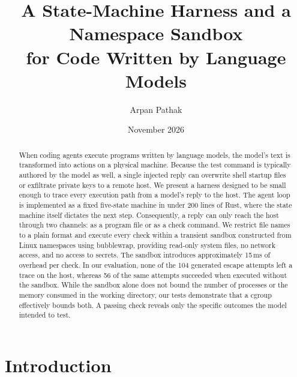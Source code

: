 \documentclass[10pt,twocolumn,a4paper]{article}
\title{\textbf{A State-Machine Harness and a Namespace Sandbox\\for Code Written by Language Models}}
\author{Arpan Pathak}
\date{November 2026}
\begin{document}
\maketitle

\begin{abstract}
When coding agents execute programs written by language models, the model's text is transformed into actions on a physical machine. Because the test command is typically authored by the model as well, a single injected reply can overwrite shell startup files or exfiltrate private keys to a remote host. We present a harness designed to be small enough to trace every execution path from a model's reply to the host. The agent loop is implemented as a fixed five-state machine in under 200 lines of Rust, where the state machine itself dictates the next step. Consequently, a reply can only reach the host through two channels: as a program file or as a check command. We restrict file names to a plain format and execute every check within a transient sandbox constructed from Linux namespaces using bubblewrap, providing read-only system files, no network access, and no access to secrets. The sandbox introduces approximately 15\,ms of overhead per check. In our evaluation, none of the 104 generated escape attempts left a trace on the host, whereas 56 of the same attempts succeeded when executed without the sandbox. While the sandbox alone does not bound the number of processes or the memory consumed in the working directory, our tests demonstrate that a cgroup effectively bounds both. A passing check reveals only the specific outcomes the model intended to test.
\end{abstract}

\section{Introduction}
\label{sec:intro}
\end{document}
